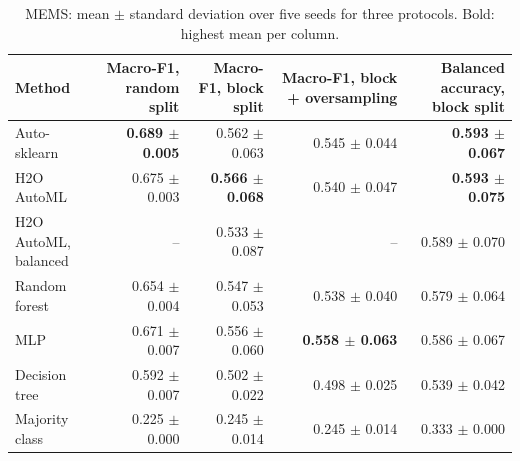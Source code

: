\begin{table}[t]
\centering
\caption{MEMS: mean $\pm$ standard deviation over five seeds for three protocols. Bold: highest mean per column.}
\label{tab:mems}
\scriptsize
\setlength{\tabcolsep}{3pt}
\begin{tabular}{@{}lrrrr@{}}
\toprule
Method & Macro-F1, random split & Macro-F1, block split & Macro-F1, block + oversampling & Balanced accuracy, block split \\
\midrule
Auto-sklearn & \textbf{0.689 $\pm$ 0.005} & 0.562 $\pm$ 0.063 & 0.545 $\pm$ 0.044 & \textbf{0.593 $\pm$ 0.067} \\
H2O AutoML & 0.675 $\pm$ 0.003 & \textbf{0.566 $\pm$ 0.068} & 0.540 $\pm$ 0.047 & \textbf{0.593 $\pm$ 0.075} \\
H2O AutoML, balanced & -- & 0.533 $\pm$ 0.087 & -- & 0.589 $\pm$ 0.070 \\
Random forest & 0.654 $\pm$ 0.004 & 0.547 $\pm$ 0.053 & 0.538 $\pm$ 0.040 & 0.579 $\pm$ 0.064 \\
MLP & 0.671 $\pm$ 0.007 & 0.556 $\pm$ 0.060 & \textbf{0.558 $\pm$ 0.063} & 0.586 $\pm$ 0.067 \\
Decision tree & 0.592 $\pm$ 0.007 & 0.502 $\pm$ 0.022 & 0.498 $\pm$ 0.025 & 0.539 $\pm$ 0.042 \\
Majority class & 0.225 $\pm$ 0.000 & 0.245 $\pm$ 0.014 & 0.245 $\pm$ 0.014 & 0.333 $\pm$ 0.000 \\
\bottomrule
\end{tabular}
\end{table}
